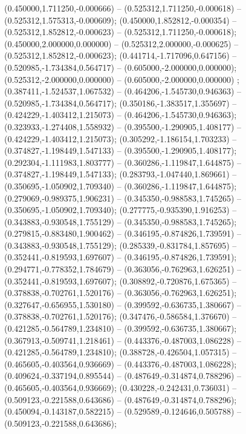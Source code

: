  (0.450000,1.711250,-0.000666) -- (0.525312,1.711250,-0.000618) -- (0.525312,1.575313,-0.000609);
 (0.450000,1.852812,-0.000354) -- (0.525312,1.852812,-0.000623) -- (0.525312,1.711250,-0.000618);
 (0.450000,2.000000,0.000000) -- (0.525312,2.000000,-0.000625) -- (0.525312,1.852812,-0.000623);
 (0.441714,-1.717096,0.647156) -- (0.520985,-1.734384,0.564717) -- (0.605000,-2.000000,0.000000);
 (0.525312,-2.000000,0.000000) -- (0.605000,-2.000000,0.000000) ;
 (0.387411,-1.524537,1.067532) -- (0.464206,-1.545730,0.946363) -- (0.520985,-1.734384,0.564717);
 (0.350186,-1.383517,1.355697) -- (0.424229,-1.403412,1.215073) -- (0.464206,-1.545730,0.946363);
 (0.323933,-1.274408,1.558932) -- (0.395500,-1.290905,1.408177) -- (0.424229,-1.403412,1.215073);
 (0.305292,-1.186154,1.703233) -- (0.374827,-1.198449,1.547133) -- (0.395500,-1.290905,1.408177);
 (0.292304,-1.111983,1.803777) -- (0.360286,-1.119847,1.644875) -- (0.374827,-1.198449,1.547133);
 (0.283793,-1.047440,1.869661) -- (0.350695,-1.050902,1.709340) -- (0.360286,-1.119847,1.644875);
 (0.279069,-0.989375,1.906231) -- (0.345350,-0.988583,1.745265) -- (0.350695,-1.050902,1.709340);
 (0.277775,-0.935390,1.916253) -- (0.343883,-0.930548,1.755129) -- (0.345350,-0.988583,1.745265);
 (0.279815,-0.883480,1.900462) -- (0.346195,-0.874826,1.739591) -- (0.343883,-0.930548,1.755129);
 (0.285339,-0.831784,1.857695) -- (0.352441,-0.819593,1.697607) -- (0.346195,-0.874826,1.739591);
 (0.294771,-0.778352,1.784679) -- (0.363056,-0.762963,1.626251) -- (0.352441,-0.819593,1.697607);
 (0.308892,-0.720876,1.675365) -- (0.378838,-0.702761,1.520176) -- (0.363056,-0.762963,1.626251);
 (0.327647,-0.656955,1.530180) -- (0.399592,-0.636735,1.380667) -- (0.378838,-0.702761,1.520176);
 (0.347476,-0.586584,1.376670) -- (0.421285,-0.564789,1.234810) -- (0.399592,-0.636735,1.380667);
 (0.367913,-0.509741,1.218461) -- (0.443376,-0.487003,1.086228) -- (0.421285,-0.564789,1.234810);
 (0.388728,-0.426504,1.057315) -- (0.465605,-0.403564,0.936669) -- (0.443376,-0.487003,1.086228);
 (0.409624,-0.337194,0.895544) -- (0.487649,-0.314874,0.788296) -- (0.465605,-0.403564,0.936669);
 (0.430228,-0.242431,0.736031) -- (0.509123,-0.221588,0.643686) -- (0.487649,-0.314874,0.788296);
 (0.450094,-0.143187,0.582215) -- (0.529589,-0.124646,0.505788) -- (0.509123,-0.221588,0.643686);
